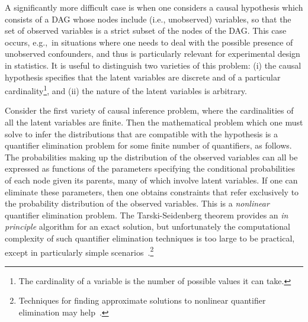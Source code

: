 \documentclass[aps,english,superscriptaddress,onecolumn,twoside,longbibliography,pra,floatfix,fleqn,nofootinbib]{revtex4-1}%
\newcommand*{\tblue}[1]{{\color{MidnightBlue}{\textbf{#1}}}}
\theoremstyle{definition}
\begin{document}
A significantly more difficult case is when one considers a causal hypothesis which consists of a DAG whose nodes include \tblue{latent} (i.e., unobserved) variables, so that the set of observed variables is a strict subset of the nodes of the DAG. This case occurs, e.g.,~in situations where one needs to deal with the possible presence of unobserved confounders, and thus is particularly relevant for experimental design in statistics. It is useful to distinguish two varieties of this problem: (i) the causal hypothesis specifies that the latent variables are discrete and of a particular cardinality\footnote{The cardinality of a variable is the number of possible values it can take.}, and (ii) the nature of the latent variables is arbitrary.  

Consider the first variety of causal inference problem, where the cardinalities of all the latent variables are finite. Then the mathematical problem which one must solve to infer the distributions that are compatible with the hypothesis is a quantifier elimination problem for some finite number of quantifiers, as follows. The probabilities making up the distribution of the observed variables can all be expressed as functions of the parameters specifying the conditional probabilities of each node given its parents, many of which involve latent variables. If one can eliminate these 
parameters, then one obtains constraints that refer exclusively to the probability distribution of the observed variables.  This is a {\em nonlinear} quantifier elimination problem. The Tarski-Seidenberg theorem provides an \emph{in principle} algorithm for an exact solution, but unfortunately the computational complexity of such quantifier elimination techniques is too large to be practical, except in particularly simple scenarios~\cite{LeeSpekkens}.\footnote{Techniques for finding approximate solutions to nonlinear quantifier elimination may help~\cite{ChavesPolynomial}.}
\end{document}
